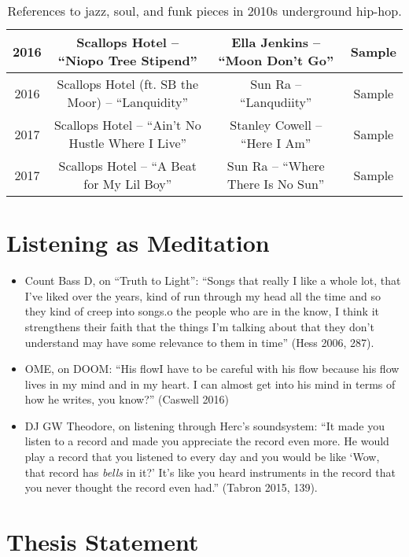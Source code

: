 \begin{sidewaystable}[p]
\begin{tabular}{|c|c|c|c|}
        2016 & Scallops Hotel -- ``Niopo Tree Stipend'' & Ella Jenkins -- ``Moon Don't Go'' & Sample \\ \hline
        2016 & Scallops Hotel (ft. SB the Moor) -- ``Lanquidity'' & Sun Ra -- ``Lanqudiity'' & Sample \\ \hline
        2017 & Scallops Hotel -- ``Ain't No Hustle Where I Live'' & Stanley Cowell -- ``Here I Am'' & Sample \\ \hline
        2017 & Scallops Hotel -- ``A Beat for My Lil Boy'' & Sun Ra -- ``Where There Is No Sun'' & Sample \\ \hline
    \end{tabular}
    \caption{References to jazz, soul, and funk pieces in 2010s underground hip-hop.}
    \label{tab:jazz_references}
\end{sidewaystable}

\section{Listening as Meditation}

\begin{itemize}
    \item Count Bass D, on ``Truth to Light'': ``Songs that really I like a whole lot, that I've liked over 
    the years, kind of run through my head all the time and so they kind of creep into songs.\textellipsis 
    [T]o the people who are in the know, I think it strengthens their faith that the things I'm talking about
    that they don't understand may have some relevance to them in time'' (Hess 2006, 287).
    \item OME, on DOOM: ``His flow\textemdash I have to be careful with his flow because his flow lives in 
    my mind and in my heart. I can almost get into his mind in terms of how he writes, you know?'' 
    (Caswell 2016)
    \item DJ GW Theodore, on listening through Herc's soundsystem: ``It made you listen to a record and made
    you appreciate the record even more. He would play a record that you listened to every day and you would
    be like `Wow, that record has \emph{bells} in it?' It's like you heard instruments in the record that you
    never thought the record even had.'' (Tabron 2015, 139).
\end{itemize}

\section{Thesis Statement}

